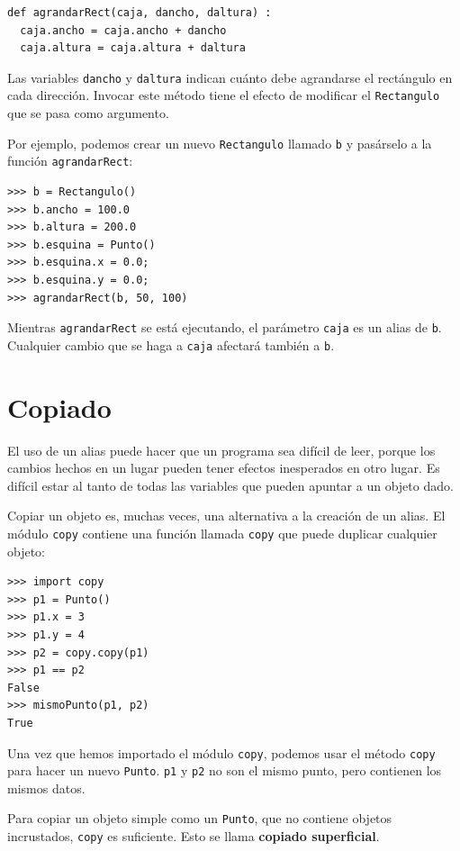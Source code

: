  
\begin{verbatim}
def agrandarRect(caja, dancho, daltura) :
  caja.ancho = caja.ancho + dancho
  caja.altura = caja.altura + daltura
\end{verbatim}

Las variables \texttt{dancho} y \texttt{daltura} indican cuánto debe
agrandarse el rectángulo en cada dirección. Invocar este método tiene
el efecto de modificar el \texttt{Rectangulo} que se pasa como argumento.

Por ejemplo, podemos crear un nuevo \texttt{Rectangulo} llamado \texttt{b}
y pasárselo a la función \texttt{agrandarRect}:
\begin{verbatim}
>>> b = Rectangulo()
>>> b.ancho = 100.0
>>> b.altura = 200.0
>>> b.esquina = Punto()
>>> b.esquina.x = 0.0;
>>> b.esquina.y = 0.0;
>>> agrandarRect(b, 50, 100)
\end{verbatim}

Mientras \texttt{agrandarRect} se está ejecutando, el parámetro \texttt{caja}
es un alias de \texttt{b}. Cualquier cambio que se haga a \texttt{caja}
afectará también a \texttt{b}.

\section{Copiado}

   

El uso de un alias puede hacer que un programa sea difícil de leer,
porque los cambios hechos en un lugar pueden tener efectos inesperados
en otro lugar. Es difícil estar al tanto de todas las variables que
pueden apuntar a un objeto dado.

Copiar un objeto es, muchas veces, una alternativa a la creación de
un alias. El módulo \texttt{copy} contiene una función llamada \texttt{copy}
que puede duplicar cualquier objeto:
\begin{verbatim}
>>> import copy
>>> p1 = Punto()
>>> p1.x = 3
>>> p1.y = 4
>>> p2 = copy.copy(p1)
>>> p1 == p2
False
>>> mismoPunto(p1, p2)
True
\end{verbatim}

Una vez que hemos importado el módulo \texttt{copy}, podemos usar
el método \texttt{copy} para hacer un nuevo \texttt{Punto}. \texttt{p1}
y \texttt{p2} no son el mismo punto, pero contienen los mismos datos.

Para copiar un objeto simple como un \texttt{Punto}, que no contiene
objetos incrustados, \texttt{copy} es suficiente. Esto se llama \textbf{copiado
superficial}.

